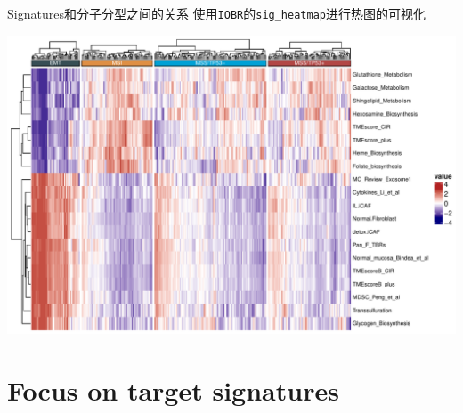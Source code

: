 \documentclass[
  12pt,
]{book}
\newenvironment{Shaded}{\begin{snugshade}}{\end{snugshade}}
\newcommand{\AttributeTok}[1]{\textcolor[rgb]{0.13,0.29,0.53}{#1}}
\newcommand{\DecValTok}[1]{\textcolor[rgb]{0.00,0.00,0.81}{#1}}
\newcommand{\FunctionTok}[1]{\textcolor[rgb]{0.13,0.29,0.53}{\textbf{#1}}}
\newcommand{\NormalTok}[1]{#1}
\newcommand{\OtherTok}[1]{\textcolor[rgb]{0.56,0.35,0.01}{#1}}
\newcommand{\SpecialCharTok}[1]{\textcolor[rgb]{0.81,0.36,0.00}{\textbf{#1}}}
\newcommand{\StringTok}[1]{\textcolor[rgb]{0.31,0.60,0.02}{#1}}
\theoremstyle{definition}
\theoremstyle{definition}
\theoremstyle{definition}
\theoremstyle{definition}
\theoremstyle{remark}
\begin{document}
Signatures和分子分型之间的关系
使用\texttt{IOBR}的\texttt{sig\_heatmap}进行热图的可视化

\begin{Shaded}
\end{Shaded}

\begin{center}\includegraphics{_main_files/figure-latex/unnamed-chunk-33-1} \end{center}

\hypertarget{focus-on-target-signatures}{%
\section{Focus on target signatures}\label{focus-on-target-signatures}}
\end{document}
